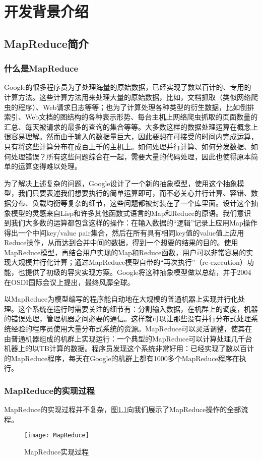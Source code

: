 \chapter{开发背景介绍}
\label{chap:2}

\section{MapReduce简介}
\subsection{什么是MapReduce}
Google的很多程序员为了处理海量的原始数据，已经实现了数以百计的、专用的计算方法。这些计算方法用来处理大量的原始数据，比如，文档抓取（类似网络爬虫的程序）、Web请求日志等等；也为了计算处理各种类型的衍生数据，比如倒排索引、Web文档的图结构的各种表示形势、每台主机上网络爬虫抓取的页面数量的汇总、每天被请求的最多的查询的集合等等。大多数这样的数据处理运算在概念上很容易理解。然而由于输入的数据量巨大，因此要想在可接受的时间内完成运算，只有将这些计算分布在成百上千的主机上。如何处理并行计算、如何分发数据、如何处理错误？所有这些问题综合在一起，需要大量的代码处理，因此也使得原本简单的运算变得难以处理。

为了解决上述复杂的问题，Google设计了一个新的抽象模型，使用这个抽象模型，我们只要表述我们想要执行的简单运算即可，而不必关心并行计算、容错、数据分布、负载均衡等复杂的细节，这些问题都被封装在了一个库里面。设计这个抽象模型的灵感来自Lisp和许多其他函数式语言的Map和Reduce的原语。我们意识到我们大多数的运算都包含这样的操作：在输入数据的“逻辑”记录上应用Map操作得出一个中间key/value pair集合，然后在所有具有相同key值的value值上应用Reduce操作，从而达到合并中间的数据，得到一个想要的结果的目的。使用MapReduce模型，再结合用户实现的Map和Reduce函数，用户可以非常容易的实现大规模并行化计算；通过MapReduce模型自带的“再次执行”（re-execution）功能，也提供了初级的容灾实现方案。Google将这种抽象模型做以总结，并于2004在OSDI国际会议上提出，最终风靡全球。

以MapReduce为模型编写的程序能自动地在大规模的普通机器上实现并行化处理。这个系统在运行时需要关注的细节有：分割输入数据，在机群上的调度，机器的错误处理，管理机器之间必要的通信。这样就可以让那些没有并行分布式处理系统经验的程序员使用大量分布式系统的资源。MapReduce可以灵活调整，使其在由普通机器组成的机群上实现运行：一个典型的MapReduce可以计算处理几千台机器上的以TB计算的数据。程序员发现这个系统非常好用：已经实现了数以百计的MapReduce程序，每天在Google的机群上都有1000多个MapReduce程序在执行。

\subsection{MapReduce的实现过程}
MapReduce的实现过程并不复杂，图\ref{fig:MapReduce}向我们展示了MapReduce操作的全部流程。
\begin{figure}[h]
 \centering
 \texttt{[image: MapReduce]}
 \caption{MapReduce实现过程}
 \label{fig:MapReduce}
\end{figure}

